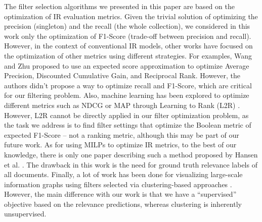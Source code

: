 
 The filter selection algorithms we presented in this paper are based on the optimization of IR evaluation metrics. Given the trivial solution of optimizing the precision (singleton) and the recall (the whole collection), we considered in this work only the optimization of F1-Score (trade-off between precision and recall). However, in the context of conventional IR models, other works have focused on the optimization of other metrics using different strategies. 
For examples, Wang and Zhu \cite{Wang2010} proposed  to use an expected score approximation to optimize Average Precision, Discounted Cumulative Gain, and Reciprocal Rank. However, the authors didn't propose a way to optimize recall and F1-Score, which are critical for our filtering problem.
Also, machine learning has been explored to optimize different metrics such as NDCG or MAP through Learning to Rank (L2R) \cite{Baeza-Yates2010}. 
However, L2R cannot be directly applied in our filter optimization problem, as the task we address is to find filter settings that optimize the Boolean metric of expected F1-Score -- not a ranking metric, although this may be part of our future work. 
As for using MILPs to optimize IR metrics, to the best of our knowledge, there is only one paper describing such a method proposed by Hansen et al. \cite{Hansen1991}. The drawback in this work is the need for ground truth relevance labels of all documents.
Finally, a lot of work has been done for visualizing large-scale information graphs using filters selected via clustering-based approaches  \cite{Ahlberg1995,Liu2014,Sankaranarayanan2009,Teitler2008,Bennamane2012,Shneiderman2013,Yifan2015,Smith2009}. However, the main difference with our work is that we have a ``supervised'' objective based on the relevance predictions, whereas clustering is inherently unsupervised.





